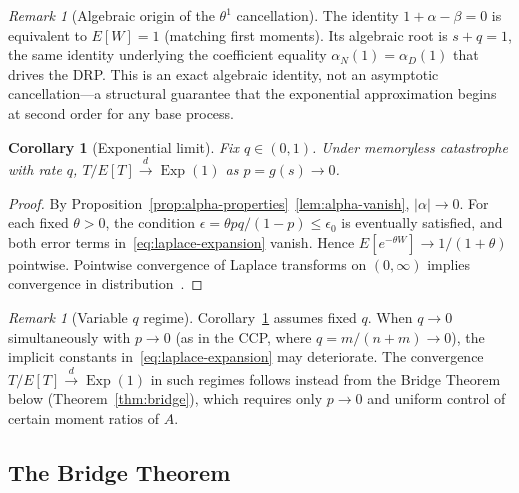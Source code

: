 \documentclass[11pt]{article}
\theoremstyle{plain}
\newtheorem{corollary}[theorem]{Corollary}
\theoremstyle{definition}
\theoremstyle{remark}
\newtheorem{remark}[theorem]{Remark}
\DeclareMathOperator{\Exp}{Exp}
\begin{document}
\begin{remark}[Algebraic origin of the $\theta^1$ cancellation]\label{rem:theta1}
The identity $1 + \alpha - \beta = 0$ is equivalent to $E[W] = 1$ (matching first moments).  Its algebraic root is $s + q = 1$, the same identity underlying the coefficient equality $\alpha_N(1) = \alpha_D(1)$ that drives the DRP.  This is an exact algebraic identity, not an asymptotic cancellation---a structural guarantee that the exponential approximation begins at second order for any base process.
\end{remark}

\begin{corollary}[Exponential limit]\label{cor:exp-limit}
Fix $q \in (0,1)$.  Under memoryless catastrophe with rate $q$, $T/E[T] \xrightarrow{d} \Exp(1)$ as $p = g(s) \to 0$.
\end{corollary}

\begin{proof}
By Proposition~\ref{prop:alpha-properties}~\eqref{lem:alpha-vanish}, $|\alpha| \to 0$.  For each fixed $\theta > 0$, the condition $\epsilon = \theta pq/(1-p) \leq \epsilon_0$ is eventually satisfied, and both error terms in~\eqref{eq:laplace-expansion} vanish.  Hence $E[e^{-\theta W}] \to 1/(1+\theta)$ pointwise.  Pointwise convergence of Laplace transforms on $(0,\infty)$ implies convergence in distribution~\cite{GK96}.
\end{proof}

\begin{remark}[Variable $q$ regime]\label{rem:variable-q}
Corollary~\ref{cor:exp-limit} assumes fixed $q$.  When $q \to 0$ simultaneously with $p \to 0$ (as in the CCP, where $q = m/(n+m) \to 0$), the implicit constants in~\eqref{eq:laplace-expansion} may deteriorate.  The convergence $T/E[T] \xrightarrow{d} \Exp(1)$ in such regimes follows instead from the Bridge Theorem below (Theorem~\ref{thm:bridge}), which requires only $p \to 0$ and uniform control of certain moment ratios of $A$.
\end{remark}


\subsection{The Bridge Theorem}\label{sec:bridge}
\end{document}
